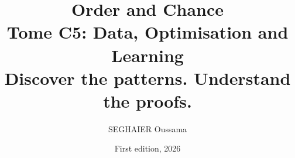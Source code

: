 \documentclass[11pt,openany]{book}
\title{\Huge\textbf{Order and Chance}\\[0.4em]\LARGE Tome C5: Data, Optimisation and Learning\\[0.6em]
\Large Discover the patterns. Understand the proofs.}
\author{SEGHAIER Oussama}
\date{First edition, 2026}
\begin{document}
\frontmatter
\makecover
\maketitle

\tableofcontents

\mainmatter



\end{document}
